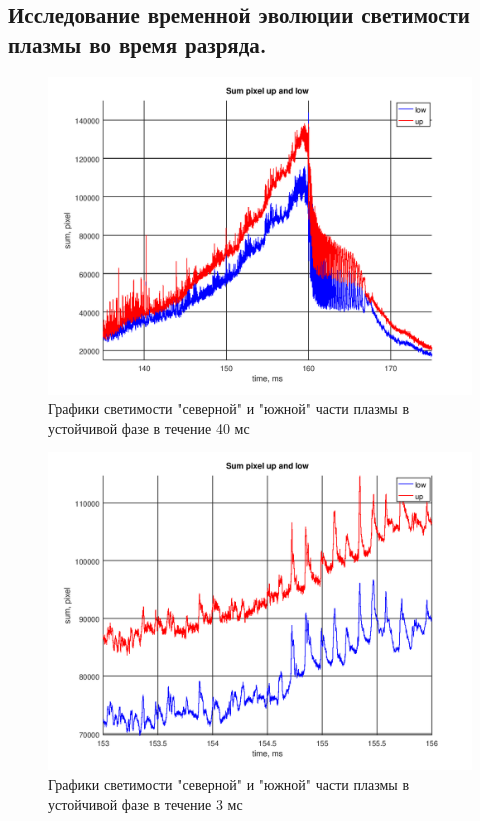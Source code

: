 \documentclass[12pt]{article}
\begin{document}
\subsection{Исследование временной эволюции светимости плазмы во время разряда.}
\begin{center}

\begin{figure}[H]
\caption{Графики светимости "северной" и "южной" части плазмы в устойчивой фазе в течение 40 мс}
\includegraphics[scale = 0.8]{plot1.png} 
\end{figure}

\begin{figure}[H]
\caption{Графики светимости "северной" и "южной" части плазмы в устойчивой фазе в течение 3 мс}
\includegraphics[scale = 0.8]{plot2.png} 
\end{figure}

\end{center}
\end{document}
